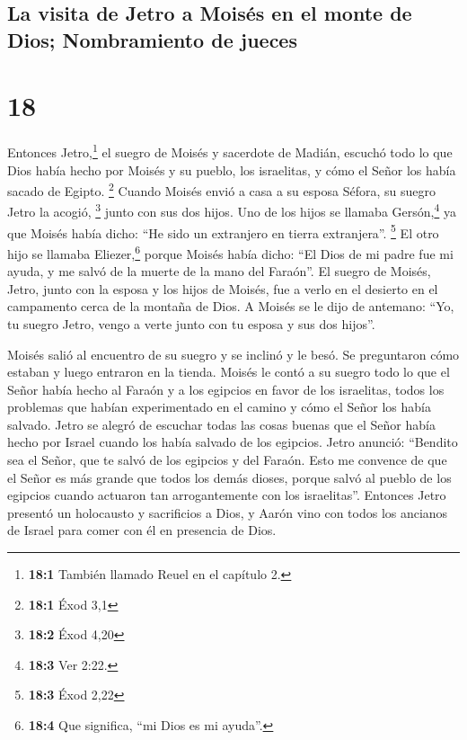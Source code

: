 \hypertarget{la-visita-de-jetro-a-moisuxe9s-en-el-monte-de-dios-nombramiento-de-jueces}{%
\subsection{La visita de Jetro a Moisés en el monte de Dios;
Nombramiento de
jueces}\label{la-visita-de-jetro-a-moisuxe9s-en-el-monte-de-dios-nombramiento-de-jueces}}

\hypertarget{section-17}{%
\section{18}\label{section-17}}

 Entonces Jetro,\footnote{\textbf{18:1} También llamado
  Reuel en el capítulo 2.} el suegro de Moisés y sacerdote de Madián,
escuchó todo lo que Dios había hecho por Moisés y su pueblo, los
israelitas, y cómo el Señor los había sacado de Egipto. \footnote{\textbf{18:1}
  Éxod 3,1}  Cuando Moisés envió a casa a su esposa
Séfora, su suegro Jetro la acogió, \footnote{\textbf{18:2} Éxod 4,20}
 junto con sus dos hijos. Uno de los hijos se llamaba
Gersón,\footnote{\textbf{18:3} Ver 2:22.} ya que Moisés había dicho:
``He sido un extranjero en tierra extranjera''. \footnote{\textbf{18:3}
  Éxod 2,22}  El otro hijo se llamaba Eliezer,\footnote{\textbf{18:4}
  Que significa, ``mi Dios es mi ayuda''.} porque Moisés había dicho:
``El Dios de mi padre fue mi ayuda, y me salvó de la muerte de la mano
del Faraón''.  El suegro de Moisés, Jetro, junto con la
esposa y los hijos de Moisés, fue a verlo en el desierto en el
campamento cerca de la montaña de Dios.  A Moisés se le
dijo de antemano: ``Yo, tu suegro Jetro, vengo a verte junto con tu
esposa y sus dos hijos''.

 Moisés salió al encuentro de su suegro y se inclinó y le
besó. Se preguntaron cómo estaban y luego entraron en la tienda.
 Moisés le contó a su suegro todo lo que el Señor había
hecho al Faraón y a los egipcios en favor de los israelitas, todos los
problemas que habían experimentado en el camino y cómo el Señor los
había salvado.  Jetro se alegró de escuchar todas las
cosas buenas que el Señor había hecho por Israel cuando los había
salvado de los egipcios.  Jetro anunció: ``Bendito sea el
Señor, que te salvó de los egipcios y del Faraón.  Esto
me convence de que el Señor es más grande que todos los demás dioses,
porque salvó al pueblo de los egipcios cuando actuaron tan
arrogantemente con los israelitas''.  Entonces Jetro
presentó un holocausto y sacrificios a Dios, y Aarón vino con todos los
ancianos de Israel para comer con él en presencia de Dios.

